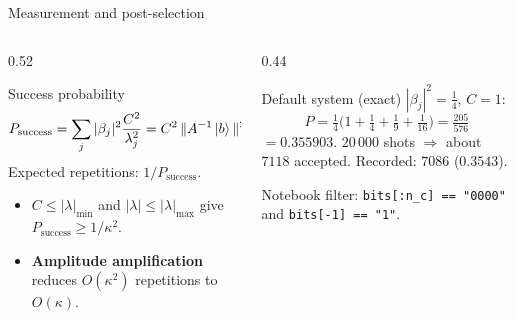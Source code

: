 \documentclass[aspectratio=169,11pt]{beamer}
\newcommand{\key}[1]{{\color{qdark}\textbf{#1}}}
\begin{document}
\begin{frame}{Measurement and post-selection}
  \begin{columns}[T]
    \begin{column}{0.52\textwidth}
      \begin{block}{Success probability}
        \[ P_{\text{success}} = \sum_j|\beta_j|^2\frac{C^2}{\lambda_j^2} = C^2\,\|A^{-1}\ket b\|^2 \]
        Expected repetitions: $1/P_{\text{success}}$.
      \end{block}
      \small
      \begin{itemize}
        \item $C \le |\lambda|_{\min}$ and $|\lambda| \le |\lambda|_{\max}$ give $P_{\text{success}} \ge 1/\kappa^2$.
        \item \key{Amplitude amplification} reduces $O(\kappa^2)$ repetitions to $O(\kappa)$.
      \end{itemize}
    \end{column}
    \begin{column}{0.44\textwidth}
      \begin{exampleblock}{Default system (exact)}
        $|\beta_j|^2 = \frac14$, $C = 1$:
        \[ P = \tfrac14\big(1 + \tfrac14 + \tfrac19 + \tfrac1{16}\big) = \tfrac{205}{576} \]
        $= 0.355903$.
        $20\,000$ shots $\Rightarrow$ about $7118$ accepted. Recorded: $7086$ ($0.3543$).
      \end{exampleblock}
      \small Notebook filter: \texttt{bits[:n\_c] == "0000"} and \texttt{bits[-1] == "1"}.
    \end{column}
  \end{columns}
\end{frame}
\end{document}
